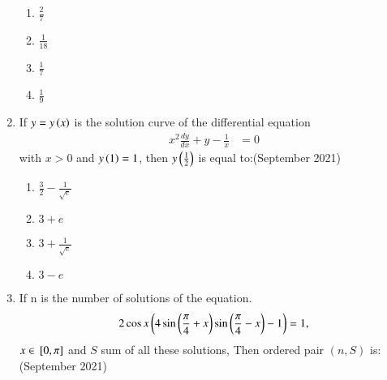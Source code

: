 \documentclass[journal,12pt,onecolumn]{IEEEtran}
\theoremstyle{remark}
\begin{document}
\begin{enumerate}
\begin{multicols}{2}

\begin{enumerate}

    \item $\frac{2}{7}$ \\
    \item $\frac{1}{18}$ 
    \item $\frac{1}{7}$ \\
    \item $\frac{1}{9}$
\end{enumerate}
\end{multicols}

\item If $y = y\left(x\right)$ is the solution curve of the differential equation
\begin{align*}
x^{2} \frac{dy}{dx} + y - \frac{1}{x} &= 0
\end{align*}
with $x>0$ and $y\left(1\right)= 1$, then $y\left(\frac{1}{2}\right)$ is equal to:\hfill (September 2021)
\begin{multicols}{2}
\begin{enumerate}
    \item $\frac{3}{2}-\frac{1}{\sqrt{e}}$\\
  
    \item $3 + e$
     \item $3 + \frac{1}{\sqrt{e}}$ \\
    \item $3 - e$
\end{enumerate}
\end{multicols}
\item If n is the number of solutions of the equation.\\
\begin{align*}
2 \cos{x}\left(4\sin{\ensuremath{\left(\frac{\pi}{4} + x\right)}}\sin{\ensuremath{\left(\frac{\pi}{4}-x\right)}}-1\right)&=1,\\
\end{align*} $x \in {}\left[0, \pi\right]$ and $S$ sum of all these solutions, Then ordered pair $(n, S)$ is:\hfill (September 2021)
\begin{multicols}{4}
\begin{enumerate}


\end{enumerate}
\end{multicols}
\end{enumerate}
\end{document}
